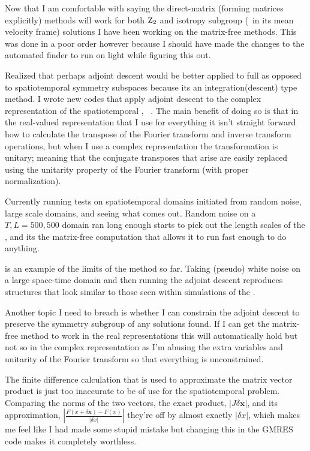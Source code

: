 Now that I am comfortable with saying the direct-matrix (forming matrices explicitly)
methods will work for both $\textrm{Z}_{2}$ and  isotropy subgroup (\rpo\ in its mean velocity frame)
solutions I have been working on the matrix-free methods. This was done in a poor order
however because I should have made the changes to the automated {\twot}
finder to run on light while figuring this out.

Realized that perhaps adjoint descent would be better applied to full {\statesp} as opposed to spatiotemporal
symmetry subspaces because its an integration(descent) type method. I wrote new codes that apply adjoint
descent to the complex representation of the spatiotemporal \KSe, \ie\
. %
The main benefit of doing so is that in the real-valued representation that I
use for everything it isn't straight forward how to calculate the transpose of
the Fourier transform and inverse transform operations, but when I use a
complex representation the transformation is unitary; meaning that the
conjugate transposes that arise are easily replaced using the unitarity
property of the Fourier transform (with proper normalization).

Currently running tests on spatiotemporal domains initiated from random noise, large scale domains, and seeing
what comes out. Random noise on a $T,L = 500,500$ domain ran long enough starts to pick out the length scales of
the \KSe, and its the matrix-free computation that allows it to run fast enough to do anything.

 is an example of the limits of the method so far. Taking (pseudo) white
noise on a large space-time domain and then running the adjoint descent reproduces structures that look similar to those
seen within simulations of the \KSe.

Another topic I need to breach is whether I can constrain the adjoint descent to
preserve the symmetry subgroup of any solutions found. If I can get the matrix-free
method to work in the real representations this will automatically hold but not
so in the complex representation as I'm abusing the extra variables and unitarity
of the Fourier transform so that everything is unconstrained.


The finite difference calculation that is used to approximate the matrix
vector product is just too inaccurate to be of use for the spatiotemporal
problem. Comparing the norms of the two vectors, the exact product, $|J \delta \mathbf{x}|$,
and its approximation,
$|\frac{F(x+\delta \mathbf{x})-F(x)}{|\delta x|}|$ they're off by almost exactly $|\delta x|$,
which makes me feel like I had made some stupid mistake but changing this in the GMRES code
makes it completely worthless.

